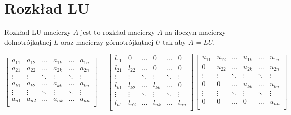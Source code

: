 \documentclass{article}
\begin{document}
\section{Rozkład LU}
Rozkład LU macierzy $A$ jest to rozkład macierzy $A$ na iloczyn macierzy dolnotrójkątnej $L$ oraz macierzy górnotrójkątnej $U$ tak aby $A = LU$.
\begin{center}
    $$
    \begin{bmatrix}
        a_{11} & a_{12} & \dots & a_{1k} & \dots & a_{1n} \\
        a_{21} & a_{22} & \dots & a_{2k} & \dots & a_{2n} \\
        \vdots & \vdots & \ddots &\vdots & \ddots & \vdots \\
        a_{k1} & a_{k2} & \dots & a_{kk} & \dots & a_{kn} \\
        \vdots & \vdots & \ddots & \vdots & \ddots & \vdots \\
        a_{n1} & a_{n2} & \dots & a_{nk} & \dots & a_{nn} \\
    \end{bmatrix}
    =
    \begin{bmatrix}
        l_{11} & 0 & \dots & 0 & \dots & 0 \\
        l_{21} & l_{22} & \dots & 0 & \dots & 0 \\
        \vdots & \vdots & \ddots &\vdots & \ddots & \vdots \\
        l_{k1} & l_{k2} & \dots & l_{kk} & \dots & 0 \\
        \vdots & \vdots & \ddots & \vdots & \ddots & \vdots \\
        l_{n1} & l_{n2} & \dots & l_{nk} & \dots & l_{nn} \\
    \end{bmatrix}
    \begin{bmatrix}
        u_{11} & u_{12} & \dots & u_{1k} & \dots & u_{1n} \\
        0 & u_{22} & \dots & u_{2k} & \dots & u_{2n} \\
        \vdots & \vdots & \ddots &\vdots & \ddots & \vdots \\
        0 & 0 & \dots & u_{kk} & \dots & u_{kn} \\
        \vdots & \vdots & \ddots & \vdots & \ddots & \vdots \\
        0 & 0 & \dots & 0 & \dots & u_{nn} \\
    \end{bmatrix}
    $$
\end{center}
\end{document}
